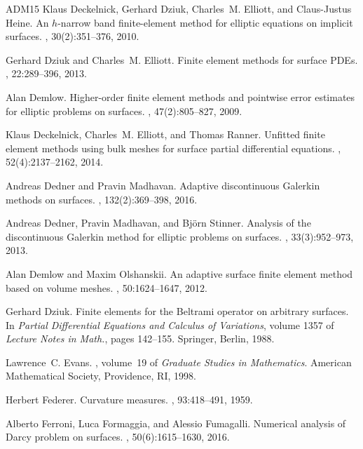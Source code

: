 \documentclass{amsart}
\begin{document}
\begin{thebibliography}{ADM{\etalchar{+}}15}
Klaus Deckelnick, Gerhard Dziuk, Charles~M. Elliott, and Claus-Justus Heine.
\newblock An {$h$}-narrow band finite-element method for elliptic equations on
  implicit surfaces.
, 30(2):351--376, 2010.

Gerhard Dziuk and Charles~M. Elliott.
\newblock Finite element methods for surface {PDE}s.
, 22:289--396, 2013.

Alan Demlow.
\newblock Higher-order finite element methods and pointwise error estimates for
  elliptic problems on surfaces.
, 47(2):805--827, 2009.

Klaus Deckelnick, Charles~M. Elliott, and Thomas Ranner.
\newblock Unfitted finite element methods using bulk meshes for surface partial
  differential equations.
, 52(4):2137--2162, 2014.

Andreas Dedner and Pravin Madhavan.
\newblock Adaptive discontinuous {G}alerkin methods on surfaces.
, 132(2):369--398, 2016.

Andreas Dedner, Pravin Madhavan, and Bj{\"o}rn Stinner.
\newblock Analysis of the discontinuous {G}alerkin method for elliptic problems
  on surfaces.
, 33(3):952--973, 2013.

Alan Demlow and Maxim Olshanskii.
\newblock An adaptive surface finite element method based on volume meshes.
, 50:1624--1647, 2012.

Gerhard Dziuk.
\newblock Finite elements for the {B}eltrami operator on arbitrary surfaces.
\newblock In {\em Partial Differential Equations and Calculus of Variations},
  volume 1357 of {\em Lecture Notes in Math.}, pages 142--155. Springer,
  Berlin, 1988.

Lawrence~C. Evans.
, volume~19 of {\em Graduate
  Studies in Mathematics}.
\newblock American Mathematical Society, Providence, RI, 1998.

Herbert Federer.
\newblock Curvature measures.
, 93:418--491, 1959.

Alberto Ferroni, Luca Formaggia, and Alessio Fumagalli.
\newblock Numerical analysis of {D}arcy problem on surfaces.
, 50(6):1615--1630, 2016.


\end{thebibliography}
\end{document}
